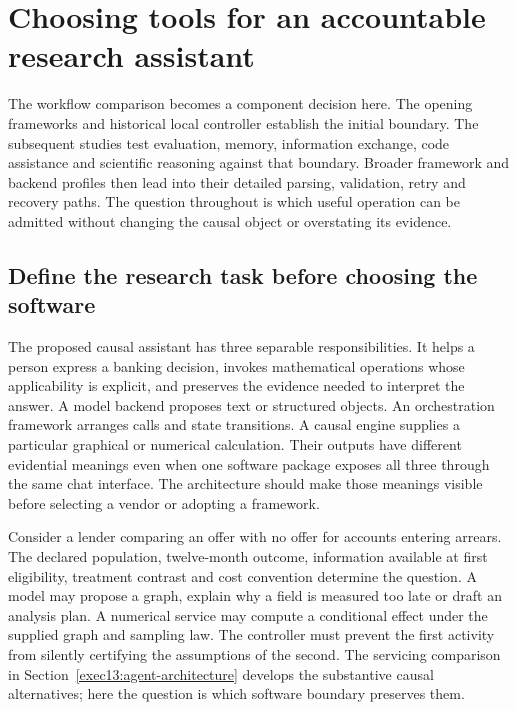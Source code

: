 \chapter{Choosing tools for an accountable research assistant}
\label{exec14:l6}
\label{ch:la05-prototype}

The workflow comparison becomes a component decision here. The opening
frameworks and historical local controller establish the initial boundary.
The subsequent studies test evaluation, memory, information exchange, code
assistance and scientific reasoning against that boundary. Broader framework
and backend profiles then lead into their detailed parsing, validation, retry
and recovery paths. The question throughout is which useful operation can
be admitted without changing the causal object or overstating its evidence.


\section{Define the research task before choosing the software}

The proposed causal assistant has three separable responsibilities. It helps
a person express a banking decision, invokes mathematical operations whose
applicability is explicit, and preserves the evidence needed to interpret the
answer. A model backend proposes text or structured objects. An orchestration
framework arranges calls and state transitions. A causal engine supplies a
particular graphical or numerical calculation. Their outputs have different
evidential meanings even when one software package exposes all three through
the same chat interface. The architecture should make those meanings visible
before selecting a vendor or adopting a framework.

Consider a lender comparing an offer with no offer for accounts entering
arrears. The declared population, twelve-month outcome, information available
at first eligibility, treatment contrast and cost convention determine the
question. A model may propose a graph, explain why a field is measured too
late or draft an analysis plan. A numerical service may compute a conditional
effect under the supplied graph and sampling law. The controller must prevent
the first activity from silently certifying the assumptions of the second.
The servicing comparison in Section~\ref{exec13:agent-architecture} develops
the substantive causal alternatives; here the question is which software
boundary preserves them.

